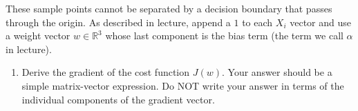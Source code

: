 These sample points cannot be separated by a decision boundary that
passes through the origin.
As described in lecture, append a $1$ to each $X_i$ vector and
use a weight vector $w \in \mathbb{R}^3$ whose last component is
the bias term (the term we call $\alpha$ in lecture).

\begin{enumerate}
\item
Derive the gradient of the cost function $J(w)$.
Your answer should be a simple matrix-vector expression.
Do NOT write your answer in terms of the individual components of
the gradient vector.

\end{enumerate}
